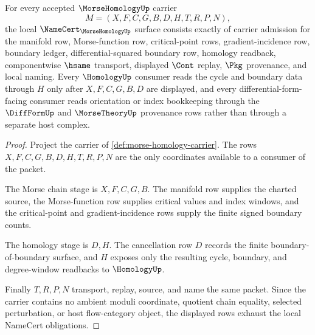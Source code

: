 \begin{theorem}
\label{thm:morse-homology-namecert-obligations}
For every accepted $\MorseHomologyUp$ carrier
$$
M=(X,F,C,G,B,D,H,T,R,P,N),
$$
the local $\NameCert_{\MorseHomologyUp}$ surface consists exactly of carrier admission for the manifold row, Morse-function row, critical-point rows, gradient-incidence row, boundary ledger, differential-squared boundary row, homology readback, componentwise $\hsame$ transport, displayed $\Cont$ replay, $\Pkg$ provenance, and local naming. Every $\HomologyUp$ consumer reads the cycle and boundary data through $H$ only after $X,F,C,G,B,D$ are displayed, and every differential-form-facing consumer reads orientation or index bookkeeping through the $\DiffFormUp$ and $\MorseTheoryUp$ provenance rows rather than through a separate host complex.
\end{theorem}
\begin{proof}
Project the carrier of \autoref{def:morse-homology-carrier}. The rows $X,F,C,G,B,D,H,T,R,P,N$ are the only coordinates available to a consumer of the packet.

The Morse chain stage is $X,F,C,G,B$. The manifold row supplies the charted source, the Morse-function row supplies critical values and index windows, and the critical-point and gradient-incidence rows supply the finite signed boundary counts.

The homology stage is $D,H$. The cancellation row $D$ records the finite boundary-of-boundary surface, and $H$ exposes only the resulting cycle, boundary, and degree-window readbacks to $\HomologyUp$.

Finally $T,R,P,N$ transport, replay, source, and name the same packet. Since the carrier contains no ambient moduli coordinate, quotient chain equality, selected perturbation, or host flow-category object, the displayed rows exhaust the local NameCert obligations.
\end{proof}


